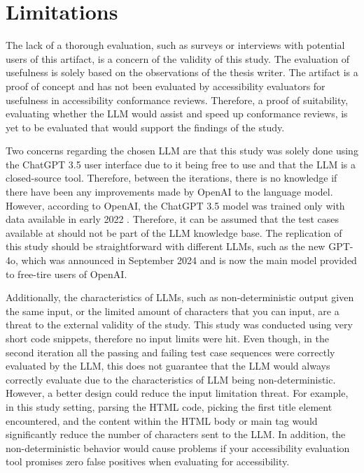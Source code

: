 \section{Limitations}

The lack of a thorough evaluation, such as surveys or interviews with potential users of this artifact, is a concern of the validity of this study. The evaluation of usefulness is solely based on the observations of the thesis writer. The artifact is a proof of concept and has not been evaluated by accessibility evaluators for usefulness in accessibility conformance reviews. Therefore, a proof of suitability, evaluating whether the LLM would assist and speed up conformance reviews, is yet to be evaluated that would support the findings of the study. 

Two concerns regarding the chosen LLM are that this study was solely done using the ChatGPT 3.5 user interface due to it being free to use and that the LLM is a closed-source tool. Therefore, between the iterations, there is no knowledge if there have been any improvements made by OpenAI to the language model. However, according to OpenAI, the ChatGPT 3.5 model was trained only with data available in early 2022 \citep{openai_35}. Therefore, it can be assumed that the test cases available at \textcite{act_rule_g88} should not be part of the LLM knowledge base. The replication of this study should be straightforward with different LLMs, such as the new GPT-4o, which was announced in September 2024 and is now the main model provided to free-tire users of OpenAI.

Additionally, the characteristics of LLMs, such as non-deterministic output given the same input, or the limited amount of characters that you can input, are a threat to the external validity of the study. This study was conducted using very short code snippets, therefore no input limits were hit. Even though, in the second iteration all the passing and failing test case sequences were correctly evaluated by the LLM, this does not guarantee that the LLM would always correctly evaluate due to the characteristics of LLM being non-deterministic. However, a better design could reduce the input limitation threat. For example, in this study setting, parsing the HTML code, picking the first title element encountered, and the content within the HTML body or main tag would significantly reduce the number of characters sent to the LLM. In addition, the non-deterministic behavior would cause problems if your accessibility evaluation tool promises zero false positives when evaluating for accessibility.

